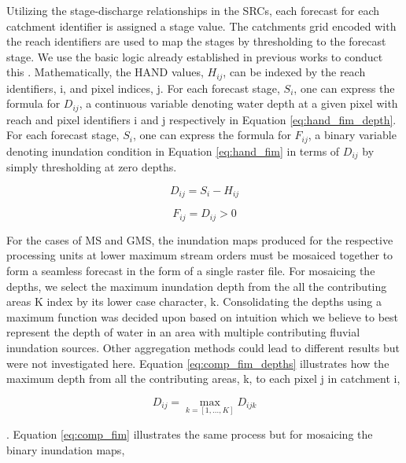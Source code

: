 \documentclass[draft]{dependencies/agujournal2019}
\begin{document}
Utilizing the stage-discharge relationships in the SRCs, each forecast for each catchment identifier is assigned a stage value. 
The catchments grid encoded with the reach identifiers are used to map the stages by thresholding to the forecast stage.
We use the basic logic already established in previous works to conduct this \cite{nobre2016hand,liu2016cybergis,maidment2017conceptual}.
Mathematically, the HAND values, $H_{ij}$, can be indexed by the reach identifiers, i, and pixel indices, j.
For each forecast stage, $S_i$, one can express the formula for $D_{ij}$, a continuous variable denoting water depth at a given pixel with reach and pixel identifiers i and j respectively in Equation \ref{eq:hand_fim_depth}.
For each forecast stage, $S_i$, one can express the formula for $F_{ij}$, a binary variable denoting inundation condition in Equation \ref{eq:hand_fim} in terms of $D_{ij}$ by simply thresholding at zero depths.
%
\begin{linenomath*}
\begin{equation}
\label{eq:hand_fim_depth}
    D_{ij} = S_i - H_{ij}
\end{equation}
\end{linenomath*}
%
\begin{linenomath*}
\begin{equation}
\label{eq:hand_fim}
    F_{ij} = D_{ij} > 0
\end{equation}
\end{linenomath*}
%
For the cases of MS and GMS, the inundation maps produced for the respective processing units at lower maximum stream orders must be mosaiced together to form a seamless forecast in the form of a single raster file.
For mosaicing the depths, we select the maximum inundation depth from the all the contributing areas K index by its lower case character, k.
Consolidating the depths using a maximum function was decided upon based on intuition which we believe to best represent the depth of water in an area with multiple contributing fluvial inundation sources.
Other aggregation methods could lead to different results but were not investigated here.
Equation \ref{eq:comp_fim_depths} illustrates how the maximum depth from all the contributing areas, k, to each pixel j in catchment i,
%
\begin{linenomath*}
\begin{equation}
\label{eq:comp_fim_depths}
    D_{ij} = \max_{k=[1,...,K]} D_{ijk}
\end{equation}
\end{linenomath*}
%
. Equation \ref{eq:comp_fim} illustrates the same process but for mosaicing the binary inundation maps,
\end{document}
